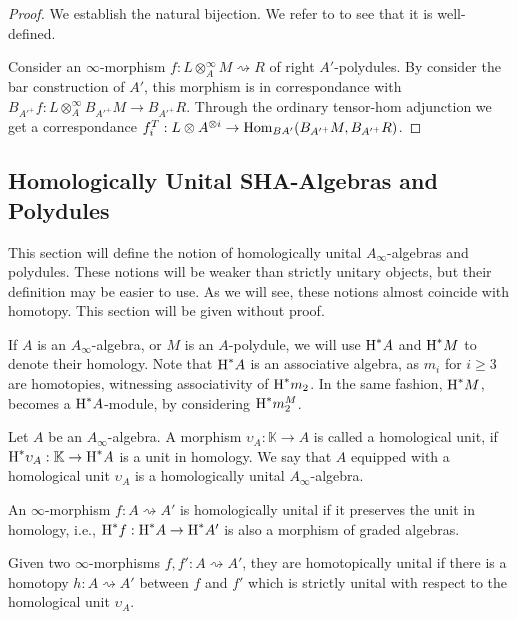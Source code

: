 \documentclass[../thesis.tex]{subfiles}
\begin{document}
            \begin{proof}
                We establish the natural bijection. We refer to \cite[Lemme 4.1.1.4]{LefevreHasegawa03} to see that it is well-defined.

                Consider an $\infty$-morphism $f : L \otimes^\infty_A M \rightsquigarrow R$ of right $A'$-polydules. By consider the bar construction of $A'$, this morphism is in correspondance with $B_{A'^+}f : L \otimes^\infty_A B_{A'^+}M \rightarrow B_{A'^+}R$. Through the ordinary tensor-hom adjunction we get a correspondance $f^T_i : L \otimes A^{\otimes i} \rightarrow \tt{Hom}_{BA'}(B_{A'^+}M,B_{A'^+}R)$.
            \end{proof}

        \subsection{Homologically Unital SHA-Algebras and Polydules}

            This section will define the notion of homologically unital $A_\infty$-algebras and polydules. These notions will be weaker than strictly unitary objects, but their definition may be easier to use. As we will see, these notions almost coincide with homotopy. This section will be given without proof.

            If $A$ is an $A_\infty$-algebra, or $M$ is an $A$-polydule, we will use $\tt{H}^*A$ and $\tt{H}^*M$ to denote their homology. Note that $\tt{H}^*A$ is an associative algebra, as $m_i$ for $i \geq 3$ are homotopies, witnessing associativity of $\tt{H}^*m_2$. In the same fashion, $\tt{H}^*M$, becomes a $\tt{H}^*A$-module, by considering $\tt{H}^*m_2^M$.

            \begin{definition}
                Let $A$ be an $A_\infty$-algebra. A morphism $\upsilon_A : \mathbb{K} \rightarrow A$ is called a homological unit, if $\tt{H}^*\upsilon_A : \mathbb{K} \rightarrow \tt{H}^*A$ is a unit in homology. We say that $A$ equipped with a homological unit $\upsilon_A$ is a homologically unital $A_\infty$-algebra.

                An $\infty$-morphism $f: A \rightsquigarrow A'$ is homologically unital if it preserves the unit in homology, i.e., $\tt{H}^*f: \tt{H}^*A \rightarrow \tt{H}^*A'$ is also a morphism of graded algebras.

                Given two $\infty$-morphisms $f,f': A \rightsquigarrow A'$, they are homotopically unital if there is a homotopy $h: A \rightsquigarrow A'$ between $f$ and $f'$ which is strictly unital with respect to the homological unit $\upsilon_A$. 
            \end{definition}
\end{document}
